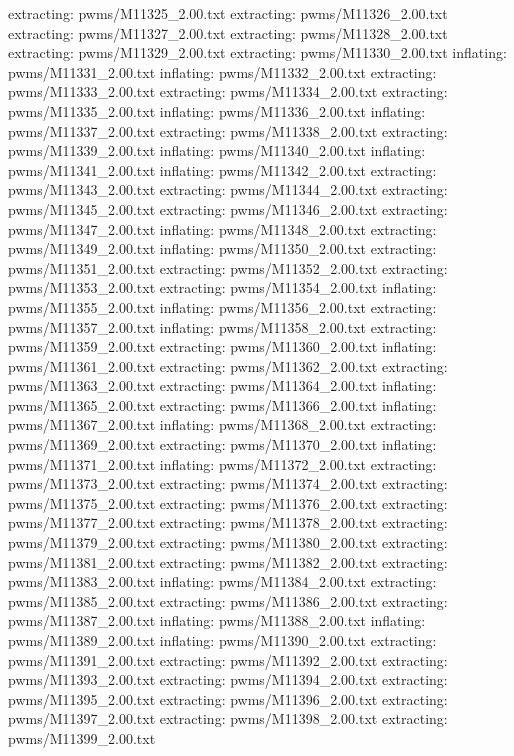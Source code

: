 \documentclass[letterpaper,10pt,english]{sphinxmanual}
\begin{document}
{\begin{sphinxVerbatim}[commandchars=\\\{\}]
 extracting: pwms/M11325\_2.00.txt
 extracting: pwms/M11326\_2.00.txt
 extracting: pwms/M11327\_2.00.txt
 extracting: pwms/M11328\_2.00.txt
 extracting: pwms/M11329\_2.00.txt
 extracting: pwms/M11330\_2.00.txt
  inflating: pwms/M11331\_2.00.txt
  inflating: pwms/M11332\_2.00.txt
 extracting: pwms/M11333\_2.00.txt
 extracting: pwms/M11334\_2.00.txt
 extracting: pwms/M11335\_2.00.txt
  inflating: pwms/M11336\_2.00.txt
  inflating: pwms/M11337\_2.00.txt
 extracting: pwms/M11338\_2.00.txt
 extracting: pwms/M11339\_2.00.txt
  inflating: pwms/M11340\_2.00.txt
  inflating: pwms/M11341\_2.00.txt
  inflating: pwms/M11342\_2.00.txt
 extracting: pwms/M11343\_2.00.txt
 extracting: pwms/M11344\_2.00.txt
 extracting: pwms/M11345\_2.00.txt
 extracting: pwms/M11346\_2.00.txt
 extracting: pwms/M11347\_2.00.txt
  inflating: pwms/M11348\_2.00.txt
 extracting: pwms/M11349\_2.00.txt
  inflating: pwms/M11350\_2.00.txt
 extracting: pwms/M11351\_2.00.txt
 extracting: pwms/M11352\_2.00.txt
 extracting: pwms/M11353\_2.00.txt
 extracting: pwms/M11354\_2.00.txt
  inflating: pwms/M11355\_2.00.txt
  inflating: pwms/M11356\_2.00.txt
 extracting: pwms/M11357\_2.00.txt
  inflating: pwms/M11358\_2.00.txt
 extracting: pwms/M11359\_2.00.txt
 extracting: pwms/M11360\_2.00.txt
  inflating: pwms/M11361\_2.00.txt
 extracting: pwms/M11362\_2.00.txt
 extracting: pwms/M11363\_2.00.txt
 extracting: pwms/M11364\_2.00.txt
  inflating: pwms/M11365\_2.00.txt
 extracting: pwms/M11366\_2.00.txt
  inflating: pwms/M11367\_2.00.txt
  inflating: pwms/M11368\_2.00.txt
 extracting: pwms/M11369\_2.00.txt
 extracting: pwms/M11370\_2.00.txt
  inflating: pwms/M11371\_2.00.txt
  inflating: pwms/M11372\_2.00.txt
 extracting: pwms/M11373\_2.00.txt
 extracting: pwms/M11374\_2.00.txt
 extracting: pwms/M11375\_2.00.txt
 extracting: pwms/M11376\_2.00.txt
 extracting: pwms/M11377\_2.00.txt
 extracting: pwms/M11378\_2.00.txt
 extracting: pwms/M11379\_2.00.txt
 extracting: pwms/M11380\_2.00.txt
 extracting: pwms/M11381\_2.00.txt
 extracting: pwms/M11382\_2.00.txt
 extracting: pwms/M11383\_2.00.txt
  inflating: pwms/M11384\_2.00.txt
 extracting: pwms/M11385\_2.00.txt
 extracting: pwms/M11386\_2.00.txt
 extracting: pwms/M11387\_2.00.txt
  inflating: pwms/M11388\_2.00.txt
  inflating: pwms/M11389\_2.00.txt
  inflating: pwms/M11390\_2.00.txt
 extracting: pwms/M11391\_2.00.txt
 extracting: pwms/M11392\_2.00.txt
 extracting: pwms/M11393\_2.00.txt
 extracting: pwms/M11394\_2.00.txt
 extracting: pwms/M11395\_2.00.txt
 extracting: pwms/M11396\_2.00.txt
 extracting: pwms/M11397\_2.00.txt
 extracting: pwms/M11398\_2.00.txt
 extracting: pwms/M11399\_2.00.txt

\end{sphinxVerbatim}}
\end{document}

